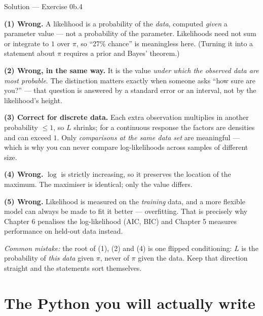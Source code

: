 \documentclass[aspectratio=169,11pt]{beamer}
\begin{document}
\begin{frame}{Solution --- Exercise 0b.4}
  \begin{solutionbox}
    \scriptsize
    \textbf{(1) Wrong.} A likelihood is a probability of the \emph{data},
    computed \emph{given} a parameter value --- not a probability of the
    parameter. Likelihoods need not sum or integrate to $1$ over $\pi$, so
    ``27\% chance'' is meaningless here. (Turning it into a statement about
    $\pi$ requires a prior and Bayes' theorem.)

    \textbf{(2) Wrong, in the same way.} It is the value \emph{under which the
    observed data are most probable}. The distinction matters exactly when
    someone asks ``how sure are you?'' --- that question is answered by a
    standard error or an interval, not by the likelihood's height.

    \textbf{(3) Correct for discrete data.} Each extra observation multiplies
    in another probability $\le 1$, so $L$ shrinks; for a continuous response
    the factors are densities and can exceed $1$. Only \emph{comparisons at
    the same data set} are meaningful ---
    which is why you can never compare log-likelihoods across samples of
    different size.

    \textbf{(4) Wrong.} $\log$ is strictly increasing, so it preserves the
    location of the maximum. The maximiser is identical; only the value
    differs.

    \textbf{(5) Wrong.} Likelihood is measured on the \emph{training} data, and
    a more flexible model can always be made to fit it better --- overfitting.
    That is precisely why Chapter 6 penalises the log-likelihood (AIC, BIC) and
    Chapter 5 measures performance on held-out data instead.

    \medskip
    \textit{Common mistake:} the root of (1), (2) and (4) is one flipped
    conditioning: $L$ is the probability of \emph{this data} given $\pi$,
    never of $\pi$ given the data. Keep that direction straight and the
    statements sort themselves.
  \end{solutionbox}
\end{frame}


\section[Python in practice]{The Python you will actually write}
\end{document}

